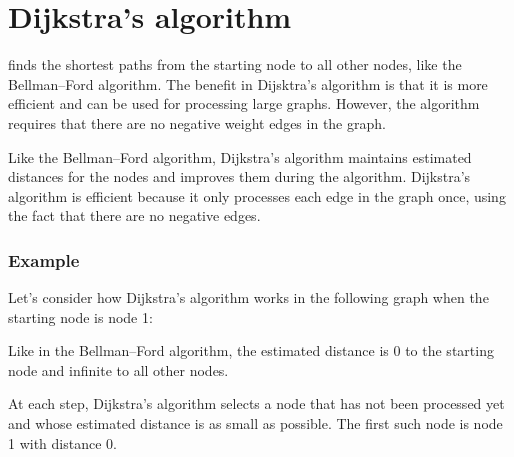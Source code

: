 \section{Dijkstra's algorithm}


 finds the shortest
paths from the starting node to all other nodes,
like the Bellman–Ford algorithm.
The benefit in Dijsktra's algorithm is that
it is more efficient and can be used for
processing large graphs.
However, the algorithm requires that there
are no negative weight edges in the graph.

Like the Bellman–Ford algorithm,
Dijkstra's algorithm maintains estimated distances
for the nodes and improves them during the algorithm.
Dijkstra's algorithm is efficient because
it only processes
each edge in the graph once, using the fact
that there are no negative edges.

\subsubsection{Example}

Let's consider how Dijkstra's algorithm
works in the following graph when the
starting node is node 1:
\begin{center}
\end{center}
Like in the Bellman–Ford algorithm,
the estimated distance is 0 to the starting node
and infinite to all other nodes.

At each step, Dijkstra's algorithm selects a node
that has not been processed yet and whose estimated distance
is as small as possible.
The first such node is node 1 with distance 0.

